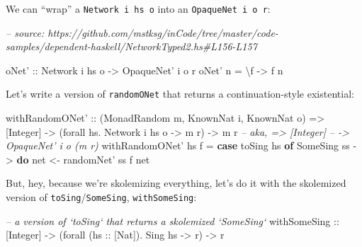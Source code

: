 \documentclass[]{article}
\newenvironment{Shaded}{}{}
\newcommand{\CommentTok}[1]{\textcolor[rgb]{0.38,0.63,0.69}{\textit{#1}}}
\newcommand{\DataTypeTok}[1]{\textcolor[rgb]{0.56,0.13,0.00}{#1}}
\newcommand{\FunctionTok}[1]{\textcolor[rgb]{0.02,0.16,0.49}{#1}}
\newcommand{\KeywordTok}[1]{\textcolor[rgb]{0.00,0.44,0.13}{\textbf{#1}}}
\newcommand{\NormalTok}[1]{#1}
\newcommand{\OtherTok}[1]{\textcolor[rgb]{0.00,0.44,0.13}{#1}}
\begin{document}
We can ``wrap'' a \texttt{Network\ i\ hs\ o} into an
\texttt{OpaqueNet\textquotesingle{}\ i\ o\ r}:

\begin{Shaded}
\begin{Highlighting}[]
\CommentTok{-- source: https://github.com/mstksg/inCode/tree/master/code-samples/dependent-haskell/NetworkTyped2.hs#L156-L157}

\OtherTok{oNet' ::} \DataTypeTok{Network}\NormalTok{ i hs o }\OtherTok{->} \DataTypeTok{OpaqueNet'}\NormalTok{ i o r}
\NormalTok{oNet' n }\FunctionTok{=}\NormalTok{ \textbackslash{}f }\OtherTok{->}\NormalTok{ f n}
\end{Highlighting}
\end{Shaded}

Let's write a version of \texttt{randomONet} that returns a continuation-style
existential:

\begin{Shaded}
\begin{Highlighting}[]
\OtherTok{withRandomONet' ::}\NormalTok{ (}\DataTypeTok{MonadRandom}\NormalTok{ m, }\DataTypeTok{KnownNat}\NormalTok{ i, }\DataTypeTok{KnownNat}\NormalTok{ o)}
                \OtherTok{=>}\NormalTok{ [}\DataTypeTok{Integer}\NormalTok{]}
                \OtherTok{->}\NormalTok{ (forall hs}\FunctionTok{.} \DataTypeTok{Network}\NormalTok{ i hs o }\OtherTok{->}\NormalTok{ m r)}
                \OtherTok{->}\NormalTok{ m r}
\CommentTok{--         aka, => [Integer]}
\CommentTok{--              -> OpaqueNet' i o (m r)}
\NormalTok{withRandomONet' hs f }\FunctionTok{=} \KeywordTok{case}\NormalTok{ toSing hs }\KeywordTok{of}
                         \DataTypeTok{SomeSing}\NormalTok{ ss }\OtherTok{->} \KeywordTok{do}
\NormalTok{                           net }\OtherTok{<-}\NormalTok{ randomNet' ss}
\NormalTok{                           f net}
\end{Highlighting}
\end{Shaded}

But, hey, because we're skolemizing everything, let's do it with the skolemized
version of \texttt{toSing}/\texttt{SomeSing}, \texttt{withSomeSing}:

\begin{Shaded}
\begin{Highlighting}[]
\CommentTok{-- a version of `toSing` that returns a skolemized `SomeSing`}
\OtherTok{withSomeSing ::}\NormalTok{ [}\DataTypeTok{Integer}\NormalTok{]}
             \OtherTok{->}\NormalTok{ (forall (}\OtherTok{hs ::}\NormalTok{ [}\DataTypeTok{Nat}\NormalTok{])}\FunctionTok{.} \DataTypeTok{Sing}\NormalTok{ hs }\OtherTok{->}\NormalTok{ r)}
             \OtherTok{->}\NormalTok{ r}
\end{Highlighting}
\end{Shaded}
\end{document}
